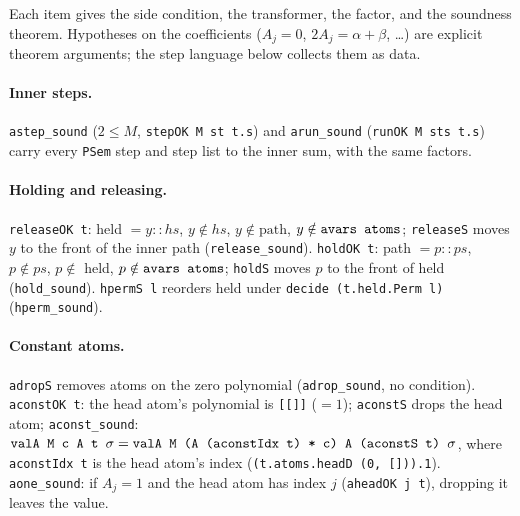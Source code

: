 Each item gives the side condition, the transformer, the factor, and the soundness theorem.
Hypotheses on the coefficients ($A_j = 0$, $2A_j = \alpha+\beta$, \dots) are explicit theorem
arguments; the step language below collects them as data.

\paragraph{Inner steps.} \textnormal{\texttt{astep\_\allowbreak{}sound}} ($2\le M$, \textnormal{\texttt{stepOK M st t.\allowbreak{}s}}) and
\textnormal{\texttt{arun\_\allowbreak{}sound}} (\textnormal{\texttt{runOK M sts t.\allowbreak{}s}}) carry every \textnormal{\texttt{PSem}} step and step list to the inner
sum, with the same factors.

\paragraph{Holding and releasing.} \textnormal{\texttt{releaseOK t}}: held $= y :: hs$, $y\notin hs$,
$y\notin\text{path}$, $y\notin\textnormal{\texttt{avars atoms}}$; \textnormal{\texttt{releaseS}} moves $y$ to the front of the
inner path (\textnormal{\texttt{release\_\allowbreak{}sound}}). \textnormal{\texttt{holdOK t}}: path $= p :: ps$, $p\notin ps$, $p\notin$ held,
$p\notin\textnormal{\texttt{avars atoms}}$; \textnormal{\texttt{holdS}} moves $p$ to the front of held (\textnormal{\texttt{hold\_\allowbreak{}sound}}).
\textnormal{\texttt{hpermS l}} reorders held under \textnormal{\texttt{decide (\allowbreak{}t.\allowbreak{}held.\allowbreak{}Perm l)}} (\textnormal{\texttt{hperm\_\allowbreak{}sound}}).

\paragraph{Constant atoms.} \textnormal{\texttt{adropS}} removes atoms on the zero polynomial
(\textnormal{\texttt{adrop\_\allowbreak{}sound}}, no condition). \textnormal{\texttt{aconstOK t}}: the head atom's polynomial is
\textnormal{\texttt{[[]]}} ($=1$); \textnormal{\texttt{aconstS}} drops the head atom; \textnormal{\texttt{aconst\_\allowbreak{}sound}}:
$\textnormal{\texttt{valA M c A t \ensuremath{\sigma}}} = \textnormal{\texttt{valA M (\allowbreak{}A (\allowbreak{}aconstIdx t) * c) A (\allowbreak{}aconstS t) \ensuremath{\sigma}}}$, where
\textnormal{\texttt{aconstIdx t}} is the head atom's index (\textnormal{\texttt{(\allowbreak{}t.\allowbreak{}atoms.\allowbreak{}headD (\allowbreak{}0,\allowbreak{} [])).\allowbreak{}1}}).
\textnormal{\texttt{aone\_\allowbreak{}sound}}: if $A_j = 1$ and the head atom has index $j$ (\textnormal{\texttt{aheadOK j t}}), dropping it
leaves the value.

